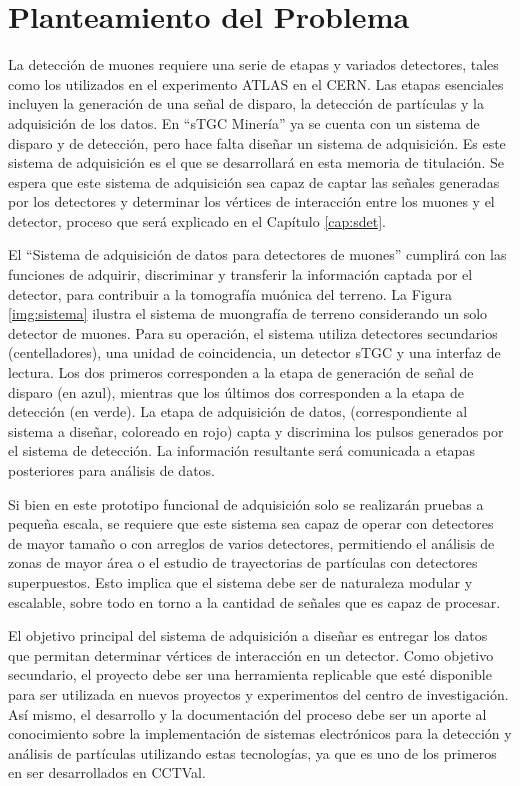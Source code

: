 \section{Planteamiento del Problema}
\label{sec:planteamiento}
	La detección de muones requiere una serie de etapas y variados detectores,  tales como los utilizados en el experimento ATLAS en el CERN. Las etapas esenciales incluyen la generación de una señal de disparo\cite{Oyanadel2020SistemaSTGC}, la detección de partículas y la adquisición de los datos. En ``sTGC Minería'' ya se cuenta con un sistema de disparo y de detección, pero hace falta diseñar un sistema de adquisición. Es este sistema de adquisición es el que se desarrollará en esta memoria de titulación. Se espera que este sistema de adquisición sea capaz de captar las señales generadas por los detectores y determinar los vértices de interacción entre los muones y el detector, proceso que será explicado en el Capítulo \ref{cap:sdet}. 
	
	El ``Sistema de adquisición de datos para detectores de muones'' cumplirá con las funciones de adquirir, discriminar y transferir la información captada por el detector, para contribuir a la tomografía muónica del terreno. La Figura \ref{img:sistema} ilustra el sistema de muongrafía de terreno considerando un solo detector de muones. Para su operación, el sistema utiliza detectores secundarios (centelladores), una unidad de coincidencia, un detector sTGC y una interfaz de lectura. Los dos primeros corresponden a la etapa de generación de señal de disparo (en azul), mientras que los últimos dos corresponden a la etapa de detección (en verde). La etapa de adquisición de datos, (correspondiente al sistema  a diseñar, coloreado en rojo) capta y discrimina los pulsos generados por el sistema de detección. La información resultante será comunicada a etapas posteriores para análisis de datos.
	
	Si bien en este prototipo funcional de adquisición solo se realizarán pruebas a pequeña escala, se requiere que este sistema sea capaz de operar con detectores de mayor tamaño o con arreglos de varios detectores, permitiendo el análisis de zonas de mayor área o el estudio de trayectorias de partículas con detectores superpuestos. Esto implica que el sistema debe ser de naturaleza modular y escalable, sobre todo en torno a la cantidad de señales que es capaz de procesar. 
	
	El objetivo principal del sistema de adquisición a diseñar es entregar los datos que permitan determinar vértices de interacción en un detector. Como objetivo secundario, el proyecto debe ser una herramienta replicable que esté disponible para ser utilizada en nuevos proyectos y experimentos del centro de investigación. Así mismo, el desarrollo y la documentación del proceso debe ser un aporte al conocimiento sobre la implementación de sistemas electrónicos para la detección y análisis de partículas utilizando estas tecnologías, ya que es uno de los primeros en ser desarrollados en CCTVal. 
	
